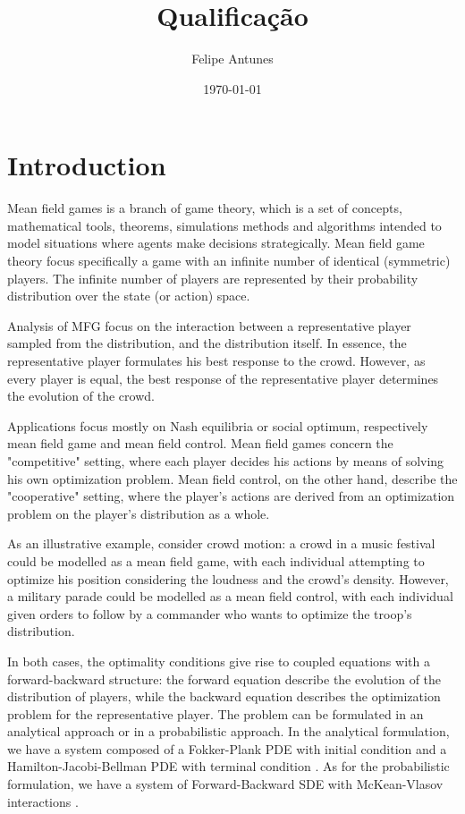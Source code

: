 \documentclass{article}
\title{Qualificação}
\author{Felipe Antunes}
\date{\today}
\begin{document}
\maketitle


\section{Introduction}

Mean field games is a branch of game theory, which is a set of concepts, mathematical tools, theorems, simulations methods and algorithms intended to model situations where agents make decisions strategically. Mean field game theory focus specifically a game with an infinite number of identical (symmetric) players. The infinite number of players are represented by their probability distribution over the state (or action) space.

Analysis of MFG focus on the interaction between a representative player sampled from the distribution, and the distribution itself. In essence, the representative player formulates his best response to the crowd. However, as every player is equal, the best response of the representative player determines the evolution of the crowd.


Applications focus mostly on Nash equilibria or social optimum, respectively mean field game and mean field control.
Mean field games concern the "competitive" setting, where each player decides his actions by means of solving  his own optimization problem. Mean field control, on the other hand, describe the "cooperative" setting, where the player's actions are derived from an optimization problem on the player's distribution as a whole. 

As an illustrative example, consider crowd motion: a crowd in a music festival could be modelled as a mean field game, with each individual attempting to optimize his position considering the loudness and the crowd's density. However, a military parade could be modelled as a mean field control, with each individual given orders to follow by a commander who wants to optimize the troop's distribution. 

In both cases, the optimality conditions give rise to coupled equations with a forward-backward structure: the forward equation describe the evolution of the distribution of players, while the backward equation describes the optimization problem for the representative player. The problem can be formulated in an analytical approach or in a probabilistic approach. 
In the analytical formulation, we have a system composed of a Fokker-Plank PDE with initial condition and a Hamilton-Jacobi-Bellman PDE with terminal condition \cite{lasry2007mean}.
As for the probabilistic formulation, we have a system of Forward-Backward SDE with McKean-Vlasov interactions \cite{carmona2013mean}. 
\end{document}
